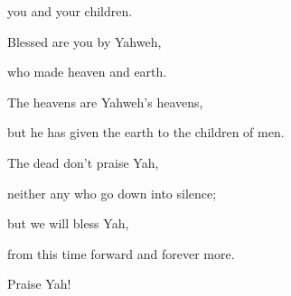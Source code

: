 {\par }{\QB you and your children.
\par }{\Q {}Blessed are you by Yahweh,
\par }{\QB who made heaven and earth.
\par }{\Q {}The heavens are Yahweh’s heavens,
\par }{\QB but he has given the earth to the children of men.
\par }{\Q {}The dead don’t praise Yah,
\par }{\QB neither any who go down into silence;
\par }{\Q {}but we will bless Yah,
\par }{\QB from this time forward and forever more.
\par }{\Q Praise Yah!

}
